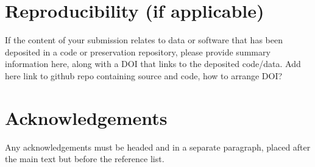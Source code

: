 \documentclass{article}
\begin{document}
\section{Reproducibility (if applicable)}

If the content of your submission relates to data or software
that has been deposited in a code or preservation repository,
please provide summary information here, along with a DOI that
links to the deposited code/data. Add here link to github repo containing
source and code, how to arrange DOI?




\section*{Acknowledgements}

Any acknowledgements must be headed and in a separate paragraph,
placed after the main text but before the reference list.




%
%
%
%
\end{document}
